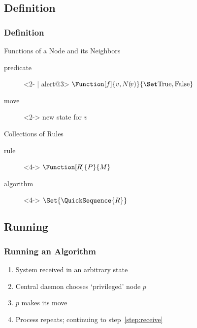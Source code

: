 \documentclass{beamer}
\begin{document}
\subsection{Definition}
\begin{frame}
  \frametitle{Definition}
  \begin{block}{Functions of a Node and its Neighbors}
    \begin{description}
    \item[predicate]<2- | alert@3> $\Function[f]{v, N(\!v)}{\SetBoolean}$
    \item[move]<2-> new state for $v$
    \end{description}
  \end{block}
  \begin{block}{Collections of Rules}
    \begin{description}
    \item[rule]<4-> $\Function[R]{P}{M}$
    \item[algorithm]<4-> $\Set{\QuickSequence{R}}$
    \end{description}
  \end{block}
\end{frame}

\subsection{Running}
\begin{frame}
  \frametitle{Running an Algorithm}
  \begin{enumerate}[<+->]
  \item System received in an arbitrary state \label{step:receive}
  \item Central daemon chooses \enquote*{privileged} node $p$
  \item $p$ makes its move
  \item Process repeats; continuing to step~\autoref{step:receive}
  \end{enumerate}
\end{frame}
\end{document}
